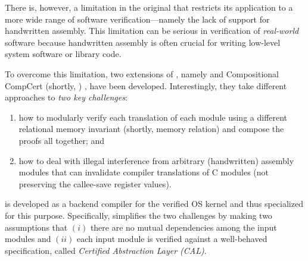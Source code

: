 There is, however, a limitation in the original \cc{} that restricts
its application to a more wide range of software verification---namely
the lack of support for handwritten assembly. This
limitation can be serious in verification of \emph{real-world}
software because handwritten assembly is often crucial for writing
low-level system software or library code.

To overcome this limitation, two extensions of \cc{}, namely \ccx{}
\cite{gu:dscal,wang:saccx} and Compositional CompCert (shortly, \ccc{}) \cite{beringer:isem,stewart:ccc}, have
been developed. Interestingly, they take different approaches to
\emph{two key challenges}:
\begin{enumerate}
\item how to modularly verify each translation of each
module using a different relational memory invariant (shortly, memory relation) and compose the proofs all
together; and
\item how to deal with illegal interference from
arbitrary (handwritten) assembly modules that can invalidate compiler
translations of C modules (\eg not preserving the
callee-save register values).
\end{enumerate}


%
\ccx{} is developed as a backend compiler for the verified OS kernel
\certikos{} \cite{CertiKOS11,CertiKOS16} and thus specialized for this purpose.
Specifically, \ccx{} simplifies the two challenges by making two
assumptions that $(i)$ there are no mutual dependencies among the
input modules and $(ii)$ each input module is verified against a
well-behaved specification, called \emph{Certified Abstraction Layer (CAL)}.

